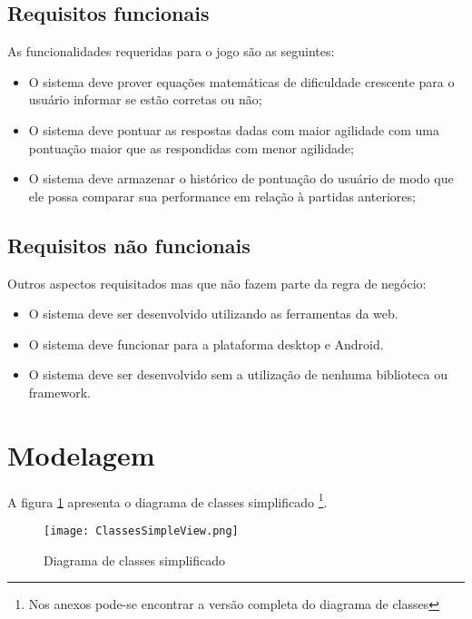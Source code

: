 \subsection{Requisitos funcionais}

\noindent As funcionalidades requeridas para o jogo são as seguintes:

\begin{itemize}
    \item O sistema deve prover equações matemáticas de dificuldade crescente para o usuário informar se estão corretas ou não;
    \item O sistema deve pontuar as respostas dadas com maior agilidade com uma pontuação maior que as respondidas com menor agilidade;
    \item O sistema deve armazenar o histórico de pontuação do usuário de modo que ele possa comparar sua performance em relação à partidas anteriores;
\end{itemize}

\subsection{Requisitos não funcionais}

\noindent Outros aspectos requisitados mas que não fazem parte da regra de negócio:

\begin{itemize}
    \item O sistema deve ser desenvolvido utilizando as ferramentas da web.
    \item O sistema deve funcionar para a plataforma desktop e Android.
    \item O sistema deve ser desenvolvido sem a utilização de nenhuma biblioteca ou framework.
\end{itemize}

\section{Modelagem}

A figura \ref{fig:simpleDiagram} apresenta o diagrama de classes
simplificado \footnote{Nos anexos pode-se encontrar a versão completa
do diagrama de classes}.

\begin{figure}[H]
    \centering
    \texttt{[image: ClassesSimpleView.png]}
	\caption{Diagrama de classes simplificado}
    \label{fig:simpleDiagram}
\end{figure}

